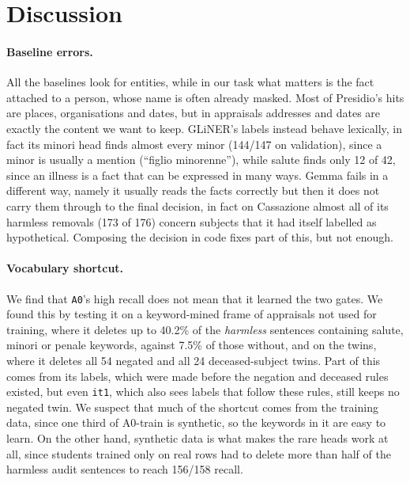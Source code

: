 \documentclass[11pt]{article}
\begin{document}

\section{Discussion}
\label{sec:discussion}

\paragraph{Baseline errors.} All the baselines look for entities, while in our task what matters is the fact attached to a person, whose name is often already masked. Most of Presidio's hits are places, organisations and dates, but in appraisals addresses and dates are exactly the content we want to keep. GLiNER's labels instead behave lexically, in fact its minori head finds almost every minor (144/147 on validation), since a minor is usually a mention (``figlio minorenne''), while salute finds only 12 of 42, since an illness is a fact that can be expressed in many ways. Gemma fails in a different way, namely it usually reads the facts correctly but then it does not carry them through to the final decision, in fact on Cassazione almost all of its harmless removals (173 of 176) concern subjects that it had itself labelled as hypothetical. Composing the decision in code fixes part of this, but not enough.

\paragraph{Vocabulary shortcut.} We find that \texttt{A0}'s high recall does not mean that it learned the two gates. We found this by testing it on a keyword-mined frame of appraisals not used for training, where it deletes up to 40.2\% of the \emph{harmless} sentences containing salute, minori or penale keywords, against 7.5\% of those without, and on the twins, where it deletes all 54 negated and all 24 deceased-subject twins. Part of this comes from its labels, which were made before the negation and deceased rules existed, but even \texttt{it1}, which also sees labels that follow these rules, still keeps no negated twin. We suspect that much of the shortcut comes from the training data, since one third of A0-train is synthetic, so the keywords in it are easy to learn. On the other hand, synthetic data is what makes the rare heads work at all, since students trained only on real rows had to delete more than half of the harmless audit sentences to reach 156/158 recall.
\end{document}
